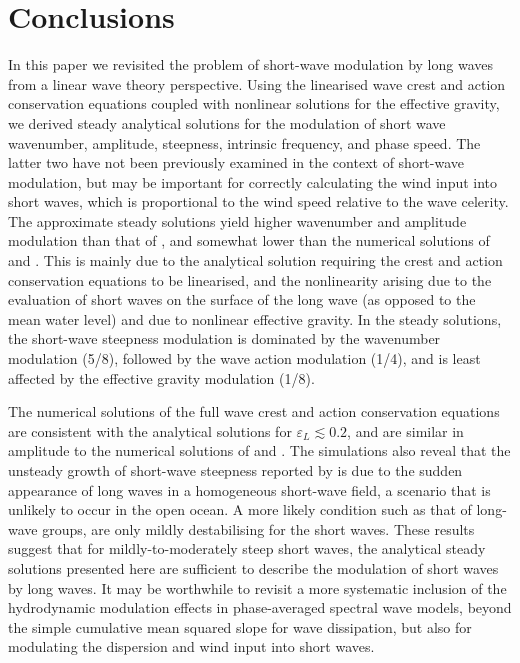 \documentclass[lineno]{jfm}
\begin{document}
\section{Conclusions}
\label{section:conclusions}

In this paper we revisited the problem of short-wave modulation by long waves
from a linear wave theory perspective.
Using the linearised wave crest and action conservation equations coupled with
nonlinear solutions for the effective gravity, we derived steady analytical
solutions for the modulation of short wave wavenumber, amplitude, steepness,
intrinsic frequency, and phase speed.
The latter two have not been previously examined in the context of short-wave
modulation, but may be important for correctly calculating the wind input into
short waves, which is proportional to the wind speed relative to the wave
celerity.
The approximate steady solutions yield higher wavenumber and amplitude
modulation than that of \citet{longuet1960changes}, and somewhat lower than 
the numerical solutions of \citet{longuet1987propagation} and
\citet{zhang1990evolution}.
This is mainly due to the analytical solution requiring the crest and action
conservation equations to be linearised, and the nonlinearity arising due
to the evaluation of short waves on the surface of the long wave (as opposed to
the mean water level) and due to nonlinear effective gravity.
In the steady solutions, the short-wave steepness modulation is dominated by
the wavenumber modulation (5/8), followed by the wave action modulation (1/4),
and is least affected by the effective gravity modulation (1/8).

The numerical solutions of the full wave crest and action conservation equations
are consistent with the analytical solutions for $\varepsilon_L \lesssim 0.2$,
and are similar in amplitude to the numerical solutions of
\citet{longuet1987propagation} and \citet{zhang1990evolution}.
The simulations also reveal that the unsteady growth of short-wave steepness
reported by \citet{peureux2021unsteady} is due to the sudden appearance of
long waves in a homogeneous short-wave field, a scenario that is unlikely to
occur in the open ocean.
A more likely condition such as that of long-wave groups, are only mildly
destabilising for the short waves.
These results suggest that for mildly-to-moderately steep short waves,
the analytical steady solutions presented here are sufficient to describe the
modulation of short waves by long waves.
It may be worthwhile to revisit a more systematic inclusion of the hydrodynamic
modulation effects in phase-averaged spectral wave models, beyond the simple
cumulative mean squared slope for wave dissipation, but also for modulating
the dispersion and wind input into short waves.
\end{document}
